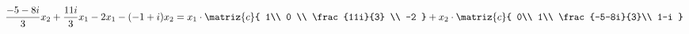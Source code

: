 \begin{enumerate}[label=(\alph*)]
$${{              \frac{-5-8i}{3}x_2 + \frac{11i}{3}x_1 \\
              -2x_1-(-1+i)x_2              
            }
            =
            x_1 \cdot
            \matriz{c}{
              1\\
              0 \\
              \frac{11i}{3} \\
              -2
            }
            +
            x_2 \cdot
            \matriz{c}{
              0\\
              1\\
              \frac{-5-8i}{3}\\
              1-i
            }
          }
        $$

\end{enumerate}

\begin{aportes}
  \item {}
  \item {}
\end{aportes}
